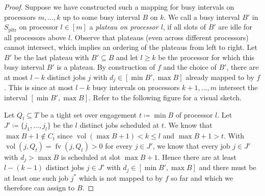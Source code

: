 \documentclass[a4paper]{article}
\DeclareMathOperator{\pltr}{pltr}
\DeclareMathOperator{\fv}{fv}
\DeclareMathOperator{\vol}{vol}
\begin{document}
\begin{proof}
  Suppose we have constructed such a mapping for busy intervals on processors $m, \ldots, k$ up to some busy interval $B$ on $k$.
  We call a busy interval $B'$ in $S_{\pltr}$ on processor $l \in [m]$ a \emph{plateau on processor $l$}, if all slots of $B'$ are idle for all processors above $l$.
  Observe that plateaus (even across different processors) cannot intersect, which implies an ordering of the plateaus from left to right.
  Let $B'$ be the last plateau with $B' \subseteq B$ and let $l \geq k$ be the processor for which this busy interval $B'$ is a plateau.
  By construction of $f$ and the choice of $B'$, there are at most $l - k$ distinct jobs $j$ with $d_j \in [\min B', \max B]$ already mapped to by $f$.
  This is since at most $l - k$ busy intervals on processors $k+1, \ldots, m$ intersect the interval $[\min B', \max B]$.
  Refer to the following figure for a visual sketch.
  \begin{figure}[H]
    \centering
    
  \end{figure}
  Let $Q_t \subseteq T$ be a tight set over engagement $t \coloneqq \min B$ of processor $l$.
  Let $J' \coloneqq \{ j_1, \ldots, j_{l} \}$ be the $l$ distinct jobs scheduled at $t$.
  We know that $\max B + 1 \notin C_t$ since $\vol(\max B + 1) < k \leq l$ and $\max B + 1 > t$.
  With $\vol(j, Q_t) = \fv(j, Q_t) > 0$ for every $j \in J'$, we know that every job $j \in J'$ with $d_j > \max B$ is scheduled at slot $\max B + 1$.
  Hence there are at least $l - (k-1)$ distinct jobs $j \in J'$ with $d_j \in [\min B', \max B]$ and there must be at least one such job $j^*$ which is not mapped to by $f$ so far and which we therefore can assign to $B$.
\end{proof}

\listoftodos{}
%


\end{document}
